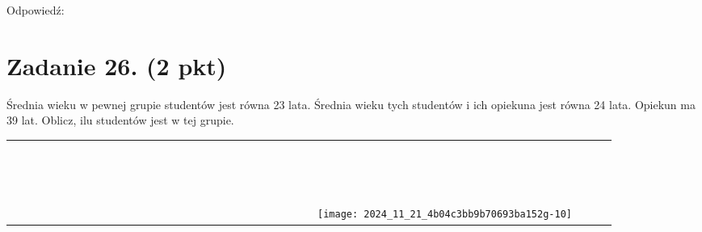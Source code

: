 \documentclass[10pt]{article}
\begin{document}
Odpowiedź:

\section*{Zadanie 26. (2 pkt)}
Średnia wieku w pewnej grupie studentów jest równa 23 lata. Średnia wieku tych studentów i ich opiekuna jest równa 24 lata. Opiekun ma 39 lat. Oblicz, ilu studentów jest w tej grupie.

\begin{center}
\begin{tabular}{|c|c|c|c|c|c|c|c|c|c|c|c|c|c|c|c|c|c|c|c|c|c|c|c|c|c|c|c|c|c|c|}
\hline
 &  &  &  &  &  &  &  &  &  &  &  &  &  &  &  &  &  &  &  &  &  &  &  &  &  &  &  &  &  &  \\
\hline
 &  &  &  &  &  &  &  &  &  &  &  &  &  &  &  &  &  &  &  &  &  &  &  &  &  &  &  &  &  &  \\
\hline
 &  &  &  &  &  &  &  &  &  &  &  &  &  &  &  &  &  &  &  &  &  &  &  &  &  &  &  &  &  &  \\
\hline
 &  &  &  &  &  &  &  &  &  &  &  &  &  &  &  &  &  &  &  &  &  &  &  &  &  &  &  &  &  &  \\
\hline
 &  &  &  &  &  &  &  &  &  &  &  &  &  &  &  &  &  &  &  &  &  &  &  &  &  &  &  &  &  &  \\
\hline
 &  &  &  &  &  &  &  &  &  &  &  &  &  &  &  &  &  &  &  &  &  &  &  &  &  &  &  &  &  &  \\
\hline
 &  &  &  &  &  &  &  &  &  &  &  &  &  &  &  &  &  &  &  &  &  &  &  &  &  &  &  &  &  &  \\
\hline
 &  &  &  &  &  &  &  &  &  &  &  &  &  &  &  &  &  &  &  &  &  &  &  &  &  &  &  &  &  &  \\
\hline
 &  &  &  &  &  &  &  &  &  &  &  &  &  &  &  &  &  &  &  &  &  &  &  &  &  &  &  &  &  &  \\
\hline
 &  &  &  &  &  &  &  &  &  &  &  &  &  &  &  &  &  &  &  &  &  &  &  &  &  &  &  &  &  &  \\
\hline
 &  &  &  &  &  &  &  &  &  &  &  &  &  &  &  &  &  &  &  &  &  &  &  &  &  &  &  &  &  &  \\
\hline
 &  &  &  &  &  &  &  &  &  &  &  &  &  &  &  &  &  &  &  &  &  &  &  &  &  &  &  &  &  &  \\
\hline
 &  &  &  &  &  &  &  &  &  &  &  &  &  &  &  &  &  &  &  &  &  &  &  &  &  &  &  &  &  &  \\
\hline
 &  &  &  &  &  &  &  &  &  &  &  &  &  &  &  &  &  &  &  &  &  &  &  &  &  &  &  &  &  &  \\
\hline
 &  &  &  &  &  &  &  &  &  &  &  &  &  &  &  &  &  &  &  &  &  &  &  &  &  &  &  &  &  &  \\
\hline
 &  &  &  &  &  &  &  &  &  &  &  &  &  &  &  &  &  &  &  &  &  &  &  &  &  &  &  &  &  &  \\
\hline
 &  &  &  &  &  &  &  &  &  &  &  &  &  &  &  &  &  &  &  &  &  &  &  &  &  &  & \texttt{[image: 2024\_11\_21\_4b04c3bb9b70693ba152g-10]}
 &  &  &  \\
\hline
\end{tabular}
\end{center}
\end{document}
